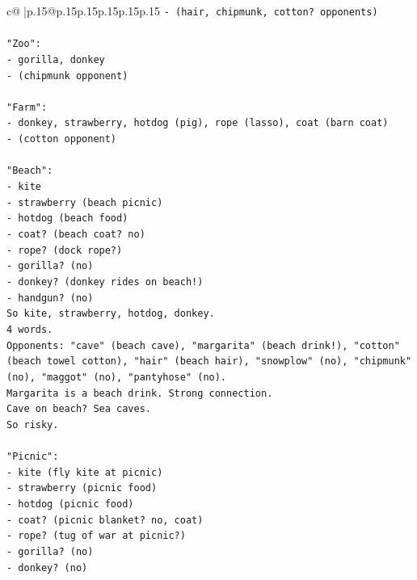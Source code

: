 \documentclass{article}
\begin{document}
{\begin{supertabular}{c@{$\;$}|p{.15\linewidth}@{}p{.15\linewidth}p{.15\linewidth}p{.15\linewidth}p{.15\linewidth}p{.15\linewidth}}
{{{\texttt{{-} (hair, chipmunk, cotton? opponents)} \\
\\ 
\texttt{"Zoo":} \\
\texttt{{-} gorilla, donkey} \\
\texttt{{-} (chipmunk opponent)} \\
\\ 
\texttt{"Farm":} \\
\texttt{{-} donkey, strawberry, hotdog (pig), rope (lasso), coat (barn coat)} \\
\texttt{{-} (cotton opponent)} \\
\\ 
\texttt{"Beach":} \\
\texttt{{-} kite} \\
\texttt{{-} strawberry (beach picnic)} \\
\texttt{{-} hotdog (beach food)} \\
\texttt{{-} coat? (beach coat? no)} \\
\texttt{{-} rope? (dock rope?)} \\
\texttt{{-} gorilla? (no)} \\
\texttt{{-} donkey? (donkey rides on beach!)} \\
\texttt{{-} handgun? (no)} \\
\texttt{So kite, strawberry, hotdog, donkey.} \\
\texttt{4 words.} \\
\texttt{Opponents: "cave" (beach cave), "margarita" (beach drink!), "cotton" (beach towel cotton), "hair" (beach hair), "snowplow" (no), "chipmunk" (no), "maggot" (no), "pantyhose" (no).} \\
\texttt{Margarita is a beach drink. Strong connection.} \\
\texttt{Cave on beach? Sea caves.} \\
\texttt{So risky.} \\
\\ 
\texttt{"Picnic":} \\
\texttt{{-} kite (fly kite at picnic)} \\
\texttt{{-} strawberry (picnic food)} \\
\texttt{{-} hotdog (picnic food)} \\
\texttt{{-} coat? (picnic blanket? no, coat)} \\
\texttt{{-} rope? (tug of war at picnic?)} \\
\texttt{{-} gorilla? (no)} \\
\texttt{{-} donkey? (no)} \\
}}}
\end{supertabular}}
\end{document}
